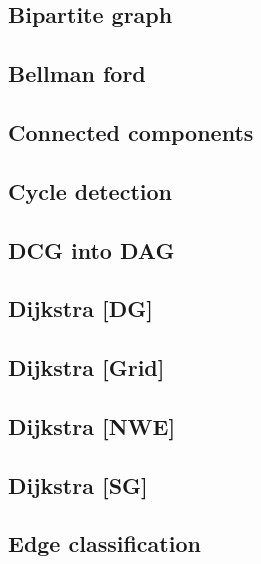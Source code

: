 \subsection{Bipartite graph}
\raggedbottom
\hrulefill
\subsection{Bellman ford}
\raggedbottom
\hrulefill
\subsection{Connected components}
\raggedbottom
\hrulefill
\subsection{Cycle detection}
\raggedbottom
\hrulefill
\subsection{DCG into DAG}
\raggedbottom
\hrulefill
\subsection{Dijkstra [DG]}
\raggedbottom
\hrulefill
\subsection{Dijkstra [Grid]}
\raggedbottom
\hrulefill
\subsection{Dijkstra [NWE]}
\raggedbottom
\hrulefill
\subsection{Dijkstra [SG]}
\raggedbottom
\hrulefill
\subsection{Edge classification}
\raggedbottom
\hrulefill
